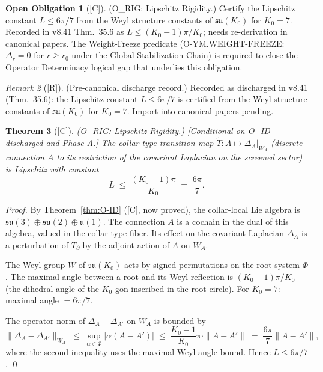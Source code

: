 \documentclass[12pt,oneside]{amsbook}
\theoremstyle{plain}
\newtheorem{theorem}{Theorem}[section]
\theoremstyle{definition}
\newtheorem{obligation}[theorem]{Open Obligation}
\theoremstyle{remark}
\newtheorem{remark}[theorem]{Remark}
\newcommand{\status}[1]{\textup{[#1]}}
\begin{document}
\begin{obligation}[\status{C}]\label{ob:O-RIG}
\textup{(O\_RIG: Lipschitz Rigidity.)}
Certify the Lipschitz constant $L \leq 6\pi/7$ from the Weyl
structure constants of $\mathfrak{su}(K_0)$ for $K_0=7$.
Recorded in v8.41 Thm.~35.6 as $L \leq (K_0-1)\pi/K_0$;
needs re-derivation in canonical papers. The Weight-Freeze
predicate (O-YM.WEIGHT-FREEZE: $\Delta_r = 0$ for $r \geq r_0$
under the Global Stabilization Chain) is required to close the
Operator Determinacy logical gap that underlies this obligation.
\end{obligation}
\begin{remark}[\status{R}]
\textup{(Pre-canonical discharge record.)} Recorded as discharged in v8.41 (Thm.~35.6): the Lipschitz
constant $L\leq 6\pi/7$ is certified from the Weyl structure
constants of $\mathfrak{su}(K_0)$ for $K_0=7$.
Import into canonical papers pending.
\end{remark}

\begin{theorem}[\status{C}]\label{thm:O-RIG}
\textup{(O\_RIG: Lipschitz Rigidity.)}
\textup{[Conditional on O\_ID discharged and Phase-A.]}\;
The collar-type transition map
$\tilde{T}: A \mapsto \Delta_A|_{W_A}$
(discrete connection $A$ to its restriction of the covariant Laplacian
on the screened sector) is Lipschitz with constant
\[
 L \;\leq\; \frac{(K_0-1)\pi}{K_0} \;=\; \frac{6\pi}{7}.
\]
\end{theorem}

\begin{proof}
By Theorem~\ref{thm:O-ID} ([C], now proved), the collar-local Lie
algebra is $\mathfrak{su}(3)\oplus\mathfrak{su}(2)\oplus\mathfrak{u}(1)$.
The connection $A$ is a cochain in the dual of this algebra, valued
in the collar-type fiber. Its effect on the covariant Laplacian
$\Delta_A$ is a perturbation of $T_\partial$ by the adjoint action of
$A$ on $W_A$.

The Weyl group $W$ of $\mathfrak{su}(K_0)$ acts by signed permutations
on the root system $\Phi$. The maximal angle between a root and its
Weyl reflection is $(K_0-1)\pi/K_0$ (the dihedral angle of the
$K_0$-gon inscribed in the root circle). For $K_0=7$: maximal angle
$= 6\pi/7$.

The operator norm of $\Delta_A - \Delta_{A'}$ on $W_A$ is bounded by
\[
 \|\Delta_A - \Delta_{A'}\|_{W_A}
 \;\leq\; \sup_{\alpha \in \Phi} |\alpha(A - A')|
 \;\leq\; \frac{K_0-1}{K_0}\pi \cdot \|A - A'\|
 \;=\; \frac{6\pi}{7}\|A - A'\|,
\]
where the second inequality uses the maximal Weyl-angle bound.
Hence $L \leq 6\pi/7$.
\qed
\end{proof}
\end{document}
